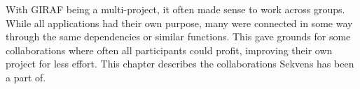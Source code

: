 With GIRAF being a multi-project, it often made sense to work across groups. While all applications had their own purpose, many were connected in some way through the same dependencies or similar functions. This gave grounds for some collaborations where often all participants could profit, improving their own project for less effort. This chapter describes the collaborations Sekvens has been a part of.